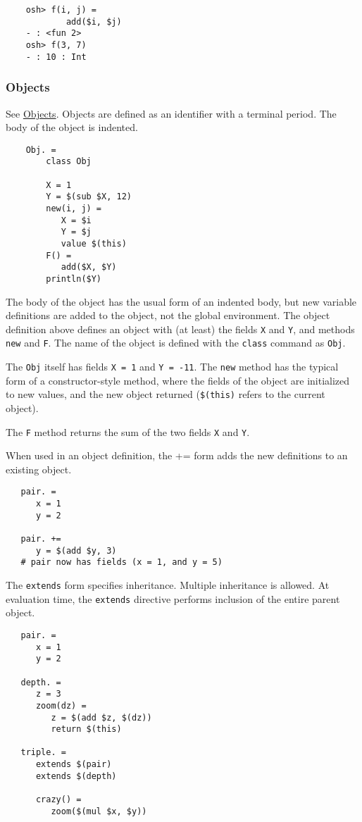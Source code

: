 \begin{verbatim}
    osh> f(i, j) =
            add($i, $j)
    - : <fun 2>
    osh> f(3, 7)
    - : 10 : Int
\end{verbatim}

\subsubsection{Objects}

See \href{omake-language.html#objects}{Objects}.  Objects are defined as an identifier with a
terminal period.  The body of the object is indented.

\begin{verbatim}
    Obj. =
        class Obj

        X = 1
        Y = $(sub $X, 12)
        new(i, j) =
           X = $i
           Y = $j
           value $(this)
        F() =
           add($X, $Y)
        println($Y)
\end{verbatim}

The body of the object has the usual form of an indented body, but new variable definitions are
added to the object, not the global environment.  The object definition above defines an object with
(at least) the fields \verb+X+ and \verb+Y+, and methods \verb+new+ and \verb+F+.  The name of the
object is defined with the \verb+class+ command as \verb+Obj+.

The \verb+Obj+ itself has fields \verb+X = 1+ and \verb+Y = -11+.  The \verb+new+ method has the
typical form of a constructor-style method, where the fields of the object are initialized to new
values, and the new object returned (\verb+$(this)+ refers to the current object).

The \verb+F+ method returns the sum of the two fields \verb+X+ and \verb+Y+.

When used in an object definition, the += form adds the new definitions to an existing object.

\begin{verbatim}
   pair. =
      x = 1
      y = 2

   pair. +=
      y = $(add $y, 3)
   # pair now has fields (x = 1, and y = 5)
\end{verbatim}

The \verb+extends+ form specifies inheritance.  Multiple inheritance is allowed.  At evaluation
time, the \verb+extends+ directive performs inclusion of the entire parent object.

\begin{verbatim}
   pair. =
      x = 1
      y = 2

   depth. =
      z = 3
      zoom(dz) =
         z = $(add $z, $(dz))
         return $(this)

   triple. =
      extends $(pair)
      extends $(depth)

      crazy() =
         zoom($(mul $x, $y))
\end{verbatim}

